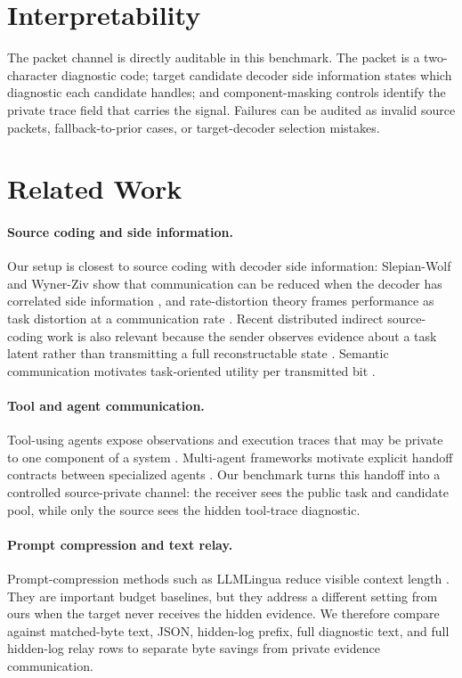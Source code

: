 \documentclass{article}
\begin{document}
\section{Interpretability}

The packet channel is directly auditable in this benchmark. The packet is a
two-character diagnostic code; target candidate decoder side information states
which diagnostic each candidate handles; and component-masking controls
identify the private trace field that carries the signal. Failures can be
audited as invalid source packets, fallback-to-prior cases, or target-decoder
selection mistakes.

\section{Related Work}

\paragraph{Source coding and side information.}
Our setup is closest to source coding with decoder side information:
Slepian-Wolf and Wyner-Ziv show that communication can be reduced when the
decoder has correlated side information
\citep{slepian1973noiseless,wyner1976rate}, and rate-distortion theory frames
performance as task distortion at a communication rate
\citep{shannon1959coding}. Recent distributed indirect source-coding work is
also relevant because the sender observes evidence about a task latent rather
than transmitting a full reconstructable state \citep{tang2024distributed}.
Semantic communication motivates task-oriented utility per transmitted bit
\citep{xie2021deep}.

\paragraph{Tool and agent communication.}
Tool-using agents expose observations and execution traces that may be private
to one component of a system \citep{yao2022react,schick2023toolformer}.
Multi-agent frameworks motivate explicit handoff contracts between specialized
agents \citep{wu2023autogen}. Our benchmark turns this handoff into a
controlled source-private channel: the receiver sees the public task and
candidate pool, while only the source sees the hidden tool-trace diagnostic.

\paragraph{Prompt compression and text relay.}
Prompt-compression methods such as LLMLingua reduce visible context length
\citep{jiang2023llmlingua}. They are important budget baselines, but they
address a different setting from ours when the target never receives the hidden
evidence. We therefore compare against matched-byte text, JSON, hidden-log
prefix, full diagnostic text, and full hidden-log relay rows to separate byte
savings from private evidence communication.
\end{document}
